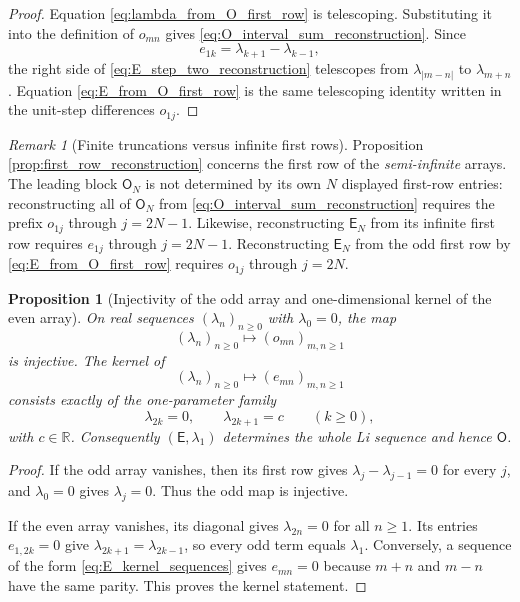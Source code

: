 \documentclass[preprint,12pt]{elsarticle}
\numberwithin{equation}{section}
\theoremstyle{plain}
\newtheorem{proposition}[theorem]{Proposition}
\theoremstyle{definition}
\theoremstyle{remark}
\newtheorem{remark}[theorem]{Remark}
\newcommand{\E}{\mathsf E}
\newcommand{\Omat}{\mathsf O}
\begin{document}
\begin{proof}
Equation \eqref{eq:lambda_from_O_first_row} is telescoping.  Substituting it into the definition of $o_{mn}$ gives \eqref{eq:O_interval_sum_reconstruction}.  Since
\begin{equation}
e_{1k}=\lambda_{k+1}-\lambda_{k-1},
\label{eq:E_first_row_step_two}
\end{equation}
the right side of \eqref{eq:E_step_two_reconstruction} telescopes from $\lambda_{|m-n|}$ to $\lambda_{m+n}$.  Equation \eqref{eq:E_from_O_first_row} is the same telescoping identity written in the unit-step differences $o_{1j}$.
\end{proof}

\begin{remark}[Finite truncations versus infinite first rows]
\label{rem:finite_first_row_warning}
Proposition \ref{prop:first_row_reconstruction} concerns the first row of the \emph{semi-infinite} arrays.  The leading block $\Omat_N$ is not determined by its own $N$ displayed first-row entries: reconstructing all of $\Omat_N$ from \eqref{eq:O_interval_sum_reconstruction} requires the prefix $o_{1j}$ through $j=2N-1$.  Likewise, reconstructing $\E_N$ from its infinite first row requires $e_{1j}$ through $j=2N-1$.  Reconstructing $\E_N$ from the odd first row by \eqref{eq:E_from_O_first_row} requires $o_{1j}$ through $j=2N$.
\end{remark}

\begin{proposition}[Injectivity of the odd array and one-dimensional kernel of the even array]
\label{prop:information_kernel}
On real sequences $(\lambda_n)_{n\ge0}$ with $\lambda_0=0$, the map
\begin{equation}
(\lambda_n)_{n\ge0}\longmapsto (o_{mn})_{m,n\ge1}
\label{eq:O_sequence_map}
\end{equation}
is injective.  The kernel of
\begin{equation}
(\lambda_n)_{n\ge0}\longmapsto (e_{mn})_{m,n\ge1}
\label{eq:E_sequence_map}
\end{equation}
consists exactly of the one-parameter family
\begin{equation}
\lambda_{2k}=0,
\qquad
\lambda_{2k+1}=c
\qquad(k\ge0),
\label{eq:E_kernel_sequences}
\end{equation}
with $c\in\mathbb R$.  Consequently $(\E,\lambda_1)$ determines the whole Li sequence and hence $\Omat$.
\end{proposition}

\begin{proof}
If the odd array vanishes, then its first row gives $\lambda_j-\lambda_{j-1}=0$ for every $j$, and $\lambda_0=0$ gives $\lambda_j=0$.  Thus the odd map is injective.

If the even array vanishes, its diagonal gives $\lambda_{2n}=0$ for all $n\ge1$.  Its entries $e_{1,2k}=0$ give $\lambda_{2k+1}=\lambda_{2k-1}$, so every odd term equals $\lambda_1$.  Conversely, a sequence of the form \eqref{eq:E_kernel_sequences} gives $e_{mn}=0$ because $m+n$ and $m-n$ have the same parity.  This proves the kernel statement.
\end{proof}
\end{document}

